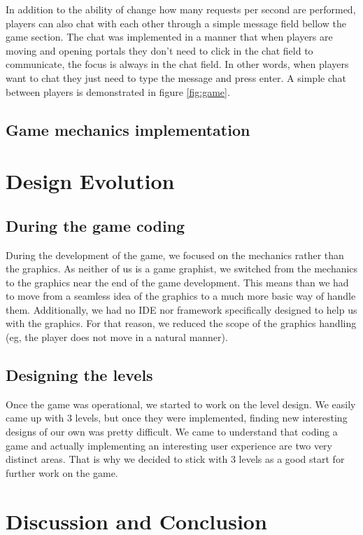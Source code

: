 \documentclass{chi-ext}
\begin{document}
In addition to the ability of change how many requests per second are performed, players can also chat with each other through a simple message field bellow the game section. The chat was implemented in a manner that when players are moving and opening portals they don't need to click in the chat field to communicate, the focus is always in the chat field. In other words, when players want to chat they just need to type the message and press enter. A simple chat between players is demonstrated in figure \ref{fig:game}.

\subsection{Game mechanics implementation}


\section{Design Evolution}
\subsection{During the game coding}
During the development of the game, we focused on the mechanics rather than the graphics. As neither of us is a game graphist, we switched from the mechanics to the graphics near the end of the game development. This means than we had to move from a seamless idea of the graphics to a much more basic way of handle them. Additionally, we had no IDE nor framework specifically designed to help us with the graphics. For that reason, we reduced the scope of the graphics handling (eg, the player does not move in a natural manner).

\subsection{Designing the levels}
Once the game was operational, we started to work on the level design. We easily came up with 3 levels, but once they were implemented, finding new interesting designs of our own was pretty difficult. We came to understand that coding a game and actually implementing an interesting user experience are two very distinct areas. That is why we decided to stick with 3 levels as a good start for further work on the game.

\section{Discussion and Conclusion}

\balance


\end{document}
